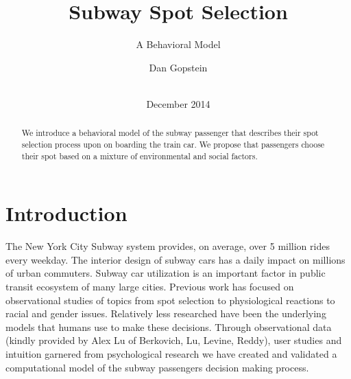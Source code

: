 \documentclass{acm_proc_article-sp}
\begin{document}
\title{Subway Spot Selection}
\subtitle{A Behavioral Model}

\author{
\alignauthor
       Dan Gopstein\\
       \\
}

\date{December 2014}



\maketitle
\begin{abstract}
We introduce a behavioral model of the subway passenger that describes their spot selection process upon on boarding the train car. We propose that passengers choose their spot based on a mixture of environmental and social factors.
\end{abstract}

\section{Introduction}
The New York City Subway system provides, on average, over 5 million rides every weekday\cite{MTAFacts}. The interior design of subway cars has a daily impact on millions of urban commuters. Subway car utilization is an important factor in public transit ecosystem of many large cities. Previous work has focused on observational studies of topics from spot selection\cite{berkovich2013observed} to physiological reactions\cite{evans2007crowding} to racial\cite{maines1979ecological} and gender\cite{hai1982sex} issues. Relatively less researched have been the underlying models that humans use to make these decisions. Through observational data (kindly provided by Alex Lu of Berkovich, Lu, Levine, Reddy), user studies and intuition garnered from psychological research\cite{evans2007crowding, hai1982sex, maines1979ecological} we have created and validated a computational model of the subway passengers decision making process.
\end{document}
